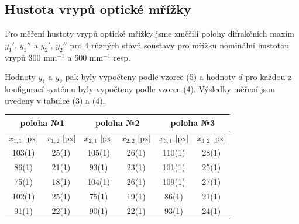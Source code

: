 \documentclass[a4paper,11pt]{article}
\begin{document}
\begin{minipage}[t]{0.5\textwidth}
        \subsection{Hustota vrypů optické mřížky}
            Pro měření hustoty vrypů optické mřížky jsme změřili polohy difrakčních maxim $y_1'$, $y_1''$ a $y_2'$, $y_2''$ pro 4 různých stavů soustavy pro mřížku nominální hustotou vrypů 300 mm$^{-1}$ a 600 mm$^{-1}$ resp. 
            \par Hodnoty $y_1$ a $y_2$ pak byly vypočteny podle vzorce (5) a hodnoty $d$ pro každou z konfigurací systému byly vypočteny podle vzorce (4). Výsledky měření jsou uvedeny v tabulce (3) a (4).

    \end{minipage}
                \vspace{10pt}
                \par \centering
                \begin{tabular}{|c|c|c|c|c|c|}
                    \hline
                    \multicolumn{2}{|c}{poloha №1} & \multicolumn{2}{|c|}{poloha №2} &  \multicolumn{2}{c|}{poloha №3} \\
                    \hline
                    $x_{1,1}$ [px] & $x_{1,2}$ [px] & $x_{2,1}$ [px] & $x_{2,2}$ [px] & $x_{3,1}$ [px] & $x_{3,2}$ [px] \\
                    \hline
                    103(1) & 25(1) & 105(1) & 26(1) & 110(1) & 28(1) \\
                    \hline
                    86(1) & 21(1) & 93(1) & 23(1) & 101(1) & 25(1) \\
                    \hline
                    75(1) & 18(1) & 104(1) & 26(1) & 109(1) & 27(1) \\
                    \hline
                    102(1) & 25(1) & 75(1) & 19(1) & 86(1) & 21(1) \\
                    \hline
                    91(1) & 22(1) & 90(1) & 22(1) & 93(1) & 24(1) \\
                    \hline
                \end{tabular}
                \captionsetup{justification=centering, font=footnotesize}
                \vspace{0pt}
                \raggedright
\newpage
\end{document}
